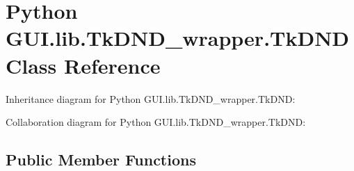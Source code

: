 \hypertarget{class_python_01_g_u_i_1_1lib_1_1_tk_d_n_d__wrapper_1_1_tk_d_n_d}{}\section{Python G\+U\+I.\+lib.\+Tk\+D\+N\+D\+\_\+wrapper.\+Tk\+D\+ND Class Reference}
\label{class_python_01_g_u_i_1_1lib_1_1_tk_d_n_d__wrapper_1_1_tk_d_n_d}


Inheritance diagram for Python G\+U\+I.\+lib.\+Tk\+D\+N\+D\+\_\+wrapper.\+Tk\+D\+ND\+:


Collaboration diagram for Python G\+U\+I.\+lib.\+Tk\+D\+N\+D\+\_\+wrapper.\+Tk\+D\+ND\+:
\subsection*{Public Member Functions}
